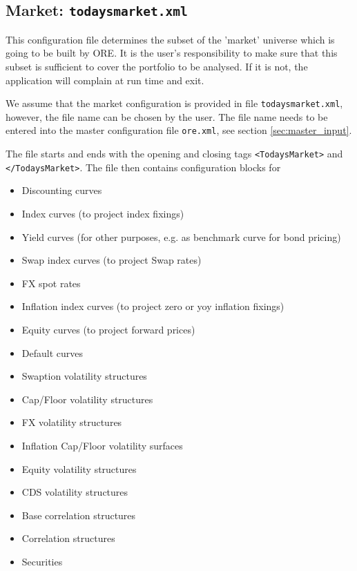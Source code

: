 \documentclass[12pt, a4paper]{article}
\begin{document}
{%
\subsection{Market: {\tt todaysmarket.xml}}\label{sec:market}

This configuration file determines the subset of the 'market' universe which is going to be built by ORE. It is the
user's responsibility to make sure that this subset is sufficient to cover the portfolio to be analysed. If it is not,
the application will complain at run time and exit.

\medskip We assume that the market configuration is provided in file {\tt todaysmarket.xml}, however, the file name can
be chosen by the user. The file name needs to be entered into the master configuration file {\tt ore.xml}, see section
\ref{sec:master_input}.

\medskip 
The file starts and ends with the opening and closing tags {\tt <TodaysMarket>} 
and {\tt </TodaysMarket>}. The file then contains configuration blocks for
\begin{itemize}
\item Discounting curves
\item Index curves (to project index fixings)
\item Yield curves (for other purposes, e.g. as benchmark curve for bond pricing)
\item Swap index curves (to project Swap rates)
\item FX spot rates
\item Inflation index curves (to project zero or yoy inflation fixings)
\item Equity curves (to project forward prices)
\item Default curves
\item Swaption volatility structures
\item Cap/Floor volatility structures
\item FX volatility structures
\item Inflation Cap/Floor volatility surfaces
\item Equity volatility structures
\item CDS volatility structures
\item Base correlation structures
\item Correlation structures
\item Securities
\end{itemize}

}
\end{document}
